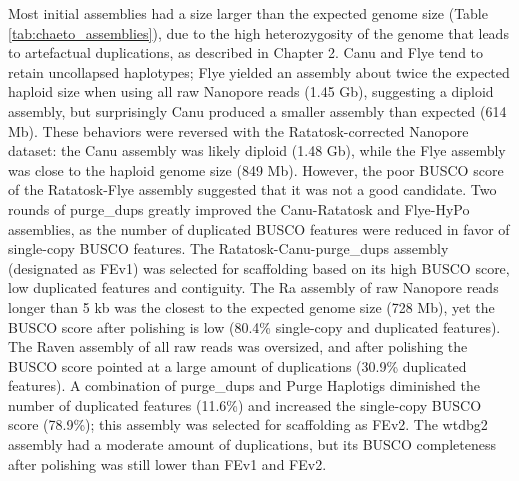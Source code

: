 Most initial assemblies had a size larger than the expected genome size (Table \ref{tab:chaeto_assemblies}), due to the high heterozygosity of the genome that leads to artefactual duplications, as described in Chapter 2. Canu and Flye tend to retain uncollapsed haplotypes; Flye yielded an assembly about twice the expected haploid size when using all raw Nanopore reads (1.45 Gb), suggesting a diploid assembly, but surprisingly Canu produced a smaller assembly than expected (614 Mb). These behaviors were reversed with the Ratatosk-corrected Nanopore dataset: the Canu assembly was likely diploid (1.48 Gb), while the Flye assembly was close to the haploid genome size (849 Mb). However, the poor BUSCO score of the Ratatosk-Flye assembly suggested that it was not a good candidate. Two rounds of purge\_dups greatly improved the Canu-Ratatosk and Flye-HyPo assemblies, as the number of duplicated BUSCO features were reduced in favor of single-copy BUSCO features. The Ratatosk-Canu-purge\_dups assembly (designated as FEv1) was selected for scaffolding based on its high BUSCO score, low duplicated features and contiguity. The Ra assembly of raw Nanopore reads longer than 5 kb was the closest to the expected genome size (728 Mb), yet the BUSCO score after polishing is low (80.4\% single-copy and duplicated features). The Raven assembly of all raw reads was oversized, and after polishing the BUSCO score pointed at a large amount of duplications (30.9\% duplicated features). A combination of purge\_dups and Purge Haplotigs diminished the number of duplicated features (11.6\%) and increased the single-copy BUSCO score (78.9\%); this assembly was selected for scaffolding as FEv2. The wtdbg2 assembly had a moderate amount of duplications, but its BUSCO completeness after polishing was still lower than FEv1 and FEv2.

